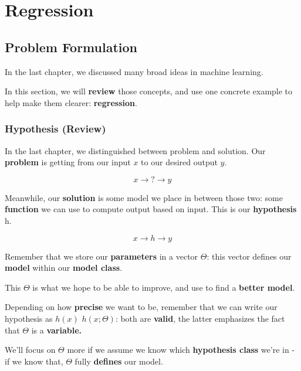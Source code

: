 \setcounter{chapter}{1} %

\chapter{Regression}

\label{chap:regression}

\section{Problem Formulation}

    In the last chapter, we discussed many broad ideas in machine learning. 
    
    In this section, we will \textbf{review} those concepts, and use one concrete example to help make them clearer: \textbf{regression}.
    
    \subsection{Hypothesis (Review)}
    
        In the last chapter, we distinguished between problem and solution. Our \textbf{problem} is getting from our input $x$ to our desired output $y$.
        
        $$ x \rightarrow \boxed{?} \rightarrow y $$
        
        Meanwhile, our \textbf{solution} is some model we place in between those two: some \textbf{function} we can use to compute output based on input. This is our \textbf{hypothesis} h.
        
        $$ x \rightarrow \boxed{h} \rightarrow y $$
        
        Remember that we store our \textbf{parameters} in a vector $\Theta$: this vector defines our \textbf{model} within our \textbf{model class}.
        
        This $\Theta$ is what we hope to be able to improve, and use to find a \textbf{better model}.
        
        Depending on how \textbf{precise} we want to be, remember that we can write our hypothesis as $h(x)$  $h(x; \Theta)$: both are \textbf{valid}, the latter emphasizes the fact that $\Theta$ is a \textbf{variable.}
        
        We'll focus on $\Theta$ more if we assume we know which \textbf{hypothesis class} we're in - if we know that, $\Theta$ fully \textbf{defines} our model.
        
